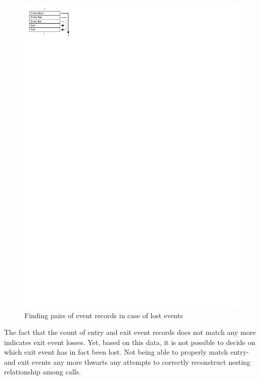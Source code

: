 \begin{figure}[htbp] 
\begin{centering} 
\includegraphics[scale=1, clip=true, viewport=0cm 26.5cm 5cm 30cm]{images/diagrams/NestingWithMissingRecords.pdf} 
\caption{Finding pairs of event records in case of lost events} 
\label{NestingWithMissingRecords} 
\end{centering} 
\end{figure}

The fact that the count of entry and exit event records does not match any more
indicates exit event losses. Yet, based on this data, it is not possible to decide 
on which exit event has in fact been lost. Not being able to properly match entry-
and exit events any more thwarts any attempts to correctly reconstruct nesting 
relationship among calls.

